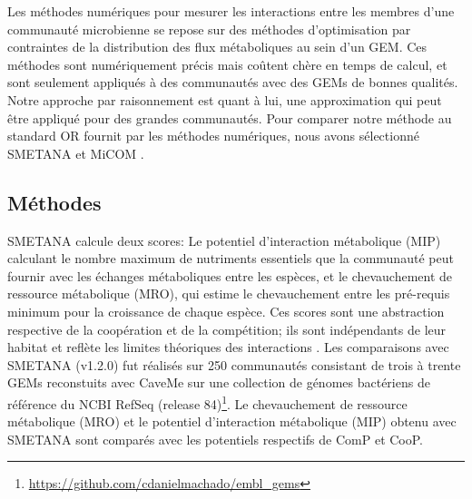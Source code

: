 Les méthodes numériques pour mesurer les interactions entre les membres d'une communauté microbienne se repose sur des méthodes d'optimisation par contraintes de la distribution des flux métaboliques au sein d'un GEM. Ces méthodes sont numériquement précis mais coûtent chère en temps de calcul, et sont seulement appliqués à des communautés avec des GEMs de bonnes qualités. Notre approche par raisonnement est quant à lui, une approximation qui peut être appliqué pour des grandes communautés. Pour comparer notre méthode au standard OR fournit par les méthodes numériques, nous avons sélectionné SMETANA\citep{Zelezniak2015} et MiCOM \citep{diener2020}.

\subsection{Méthodes} SMETANA calcule deux scores: Le potentiel d'interaction métabolique (MIP) calculant le nombre maximum de nutriments essentiels que la communauté peut fournir avec les échanges métaboliques entre les espèces, et le chevauchement de ressource métabolique (MRO), qui estime le chevauchement entre les pré-requis  minimum pour la croissance de chaque espèce. Ces scores sont une abstraction respective de la coopération et de la compétition; ils sont indépendants de leur habitat et reflète les limites théoriques des interactions \citep{Machado2021}. Les comparaisons avec SMETANA (v1.2.0) fut réalisés sur 250 communautés consistant de trois à trente GEMs reconstuits avec CaveMe \citep{Machado2018} sur une collection de génomes bactériens de référence du NCBI RefSeq (release 84)\footnote{\url{https://github.com/cdanielmachado/embl\_gems}}. Le chevauchement de ressource métabolique (MRO) et le potentiel d'interaction métabolique (MIP) obtenu avec SMETANA sont comparés avec les potentiels respectifs de ComP et CooP. 

